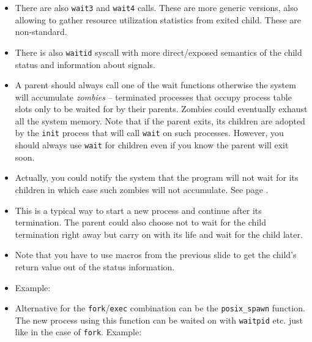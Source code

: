 \begin{itemize}
\begin{itemize}
    \end{itemize}
\item There are also \texttt{wait3} and \texttt{wait4} calls. These are more
generic versions, also allowing to gather resource utilization statistics from
exited child. These are non-standard.
\item There is also \texttt{waitid} syscall with more direct/exposed semantics
of the child status and information about signals.
\item A parent should always call one of the wait functions otherwise the system
will accumulate \emph{zombies} -- terminated processes that occupy process table
slots only to be waited for by their parents.  Zombies could eventually exhaust
all the system memory.  Note that if the parent exits, its children are adopted
by the \texttt{init} process that will call \texttt{wait} on such processes.
However, you should always use \texttt{wait} for children even if you know the
parent will exit soon.
\item Actually, you could notify the system that the program will not wait for
its children in which case such zombies will not accumulate.  See page
\pageref{IGNORE_SIG_CHLD}.
\end{itemize}


\begin{slide}
\begin{center}

\end{center}
\end{slide}

\begin{itemize}
\item This is a typical way to start a new process and continue after its
termination.  The parent could also choose not to wait for the child termination
right away but carry on with its life and wait for the child later.
\item Note that you have to use macros from the previous slide to get the
child's return value out of the status information.
\item {} Example: 
\item {} Alternative for the \texttt{fork}/\texttt{exec} combination
can be the \texttt{posix\_spawn} function. The new process using this function
can be waited on with \texttt{waitpid} etc. just like in the case of
\texttt{fork}. Example: 
\end{itemize}

